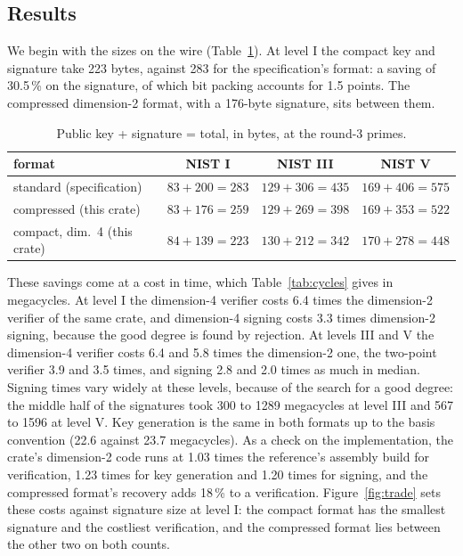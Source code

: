 \documentclass[version=preprint]{iacrcc}
\begin{document}
    \subsection{Results}
    \label{sec:results}
    We begin with the sizes on the wire (Table~\ref{tab:sizes}). At level I
    the compact key and signature take 223 bytes, against 283 for the
    specification's format: a saving of 30.5\,\% on the signature, of which
    bit packing accounts for 1.5 points. The compressed
    dimension-2 format, with a 176-byte signature, sits between them.

    \begin{table}[t]
        \centering
        \begin{threeparttable}
            \caption{Public key + signature = total, in bytes, at the round-3
                primes.}
            \label{tab:sizes}
            \footnotesize
            \setlength{\tabcolsep}{3.5pt}
            \begin{tabular}{l c c c}
                \toprule
                format & NIST I & NIST III & NIST V \\
                \midrule
                standard (specification) & $83 + 200 = 283$ & $129 + 306 = 435$ & $169 + 406 = 575$ \\
                compressed (this crate) & $83 + 176 = 259$ & $129 + 269 = 398$ & $169 + 353 = 522$ \\
                compact, dim.\ 4 (this crate) & $84 + 139 = 223$ & $130 + 212 = 342$ & $170 + 278 = 448$ \\
                
                \bottomrule
            \end{tabular}
        \end{threeparttable}
    \end{table}

    These savings come at a cost in time, which Table~\ref{tab:cycles} gives in
    megacycles. At level I the dimension-4 verifier costs 6.4 times the
    dimension-2 verifier of the same crate, and dimension-4 signing costs 3.3
    times dimension-2 signing, because the good degree is found by rejection. At levels III and V the dimension-4 verifier costs 6.4 and 5.8
    times the dimension-2 one, the two-point verifier 3.9 and 3.5 times, and
    signing 2.8 and 2.0 times as much in median. Signing times vary widely at
    these levels, because of the search for a good degree: the middle half of
    the signatures took 300 to 1289 megacycles at level III and 567 to 1596 at
    level V.
    Key generation is the same in both formats up to the basis convention
    (22.6 against 23.7 megacycles). As a check on the implementation, the
    crate's dimension-2 code runs at 1.03 times the reference's assembly build
    for verification, 1.23 times for key generation and 1.20 times for
    signing, and the compressed format's recovery adds 18\,\% to a
    verification. Figure~\ref{fig:trade} sets these costs against signature
    size at level I: the compact format has the smallest signature and the
    costliest verification, and the compressed format lies between the other
    two on both counts.
\end{document}
